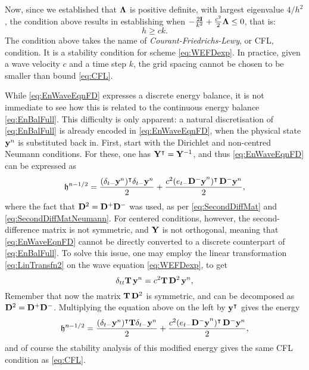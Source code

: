 \documentclass[11pt,twoside,a4paper,english]{book}
\newcommand{\etm}{e_{t-}}
\newcommand{\dtm}{\delta_{t-}}
\newcommand{\dtt}{\delta_{tt}}
\begin{document}
Now, since we established that ${\bf \Lambda}$ is positive definite, with largest eigenvalue $4/h^2$, the condition above results in establishing when $-\frac{2{\bf I}}{k^2} + \frac{c^2}{2}{\bf \Lambda}\leq 0$, that is:
\begin{equation}\label{eq:CFL}
h\geq ck.
\end{equation}
The condition  above takes the name of \emph{Courant-Friedrichs-Lewy}, or CFL, condition. It is a stability condition for scheme  \eqref{eq:WEFDexp}. In practice, given a wave velocity $c$ and a time step $k$, the grid spacing cannot be chosen to be smaller than bound \eqref{eq:CFL}.



While \eqref{eq:EnWaveEqnFD} expresses a discrete energy balance, it is not immediate to see how this is related to the continuous energy balance \eqref{eq:EnBalFull}. This difficulty is only apparent: a natural discretisation of \eqref{eq:EnBalFull} is already encoded in \eqref{eq:EnWaveEqnFD}, when the physical state ${\bf y}^n$ is substituted back in. First, start with the Dirichlet and non-centred Neumann conditions. For these, one has ${\bf Y}^\intercal = {\bf Y}^{-1}$, and thus \eqref{eq:EnWaveEqnFD} can be expressed as
\begin{equation}
{\mathfrak h}^{n-1/2} = \frac{(\dtm {\bf y}^n)^\intercal \dtm {\bf y}^n}{2} + \frac{c^2(\etm {\bf {\bf D}^-{\bf y}}^n)^\intercal \, {\bf D}^-{\bf y}^n}{2},
\end{equation}
where the fact that ${\bf D}^2 = {\bf D}^+{\bf D}^-$ was used, as per \eqref{eq:SecondDiffMat} and \eqref{eq:SecondDiffMatNeumann}. For centered conditions, however, the second-difference matrix is not symmetric, and ${\bf Y}$ is not orthogonal, meaning that \eqref{eq:EnWaveEqnFD} cannot be directly converted to a discrete counterpart of \eqref{eq:EnBalFull}. To solve this issue, one may employ the linear transformation \eqref{eq:LinTransfn2} on the wave equation \eqref{eq:WEFDexp}, to get 
\begin{equation}
\dtt {\bf T}\,{\bf y}^n = c^2 {\bf T}\,{\bf D}^2 \,{\bf y}^n,
\end{equation}
Remember that now the matrix ${\bf T}\,{\bf D}^2$ is symmetric, and can be decomposed as ${\bf D}^2 = {\bf D}^+{\bf D}^-$. Multiplying the equation above on the left by ${\bf y}^\intercal$ gives the energy
\begin{equation}
{\mathfrak h}^{n-1/2} = \frac{(\dtm {\bf y}^n)^\intercal {\bf T} \dtm {\bf y}^n}{2} + \frac{c^2(\etm {\bf {\bf D}^-{\bf y}}^n)^\intercal \, {\bf D}^-{\bf y}^n}{2},
\end{equation}
and of course the stability analysis of this modified energy gives the same CFL condition as \eqref{eq:CFL}.
\end{document}
